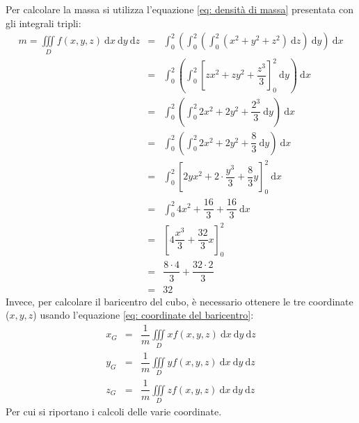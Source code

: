 \documentclass[a4paper]{article}
\begin{document}
	\noindent
	Per calcolare la massa si utilizza l'equazione \ref{eq: densità di massa} presentata con gli integrali tripli:
	\begin{equation*}
		\begin{array}{rcl}
			m = \displaystyle\iiint\limits_{D} f\left(x,y,z\right) \:\mathrm{d}x\:\mathrm{d}y\:\mathrm{d}z 
			&=&
			\displaystyle\int_{0}^{2} \left(\int_{0}^{2} \left(\int_{0}^{2} \left(x^{2}+y^{2}+z^{2}\right) \:\mathrm{d}z\right) \: \mathrm{d}y\right) \:\mathrm{d}x \\ [1.5em]
			&=&
			\displaystyle\int_{0}^{2} \left(\int_{0}^{2} \left[ zx^{2}+zy^{2}+ \dfrac{z^{3}}{3} \right]_{0}^{2} \: \mathrm{d}y\right) \:\mathrm{d}x \\ [1.5em]
			&=&
			\displaystyle\int_{0}^{2} \left(\int_{0}^{2} 2x^{2}+ 2y^{2}+ \dfrac{2^{3}}{3} \: \mathrm{d}y\right) \:\mathrm{d}x \\ [1.5em]
			&=&
			\displaystyle\int_{0}^{2} \left(\int_{0}^{2} 2x^{2}+ 2y^{2}+ \dfrac{8}{3} \: \mathrm{d}y\right) \:\mathrm{d}x \\ [1.5em]
			&=&
			\displaystyle\int_{0}^{2} \left[ 2yx^{2}+ 2 \cdot \dfrac{y^{3}}{3}+ \dfrac{8}{3}y \right]_{0}^{2} \:\mathrm{d}x \\ [1.5em]
			&=&
			\displaystyle\int_{0}^{2} 4x^{2}+ \dfrac{16}{3} + \dfrac{16}{3} \:\mathrm{d}x \\ [1.5em]
			&=&
			\left[4\dfrac{x^{3}}{3} + \dfrac{32}{3}x\right]_{0}^{2} \\ [1.5em]
			&=&
			\dfrac{8\cdot 4}{3} + \dfrac{32 \cdot 2}{3} \\ [1em]
			&=&
			32
		\end{array}
	\end{equation*}
	Invece, per calcolare il baricentro del cubo, è necessario ottenere le tre coordinate ($x,y,z$) usando l'equazione \ref{eq: coordinate del baricentro}:
	\begin{equation*}
		\begin{array}{rcl}
			x_{G} &=& \dfrac{1}{m} \displaystyle\iiint\limits_{D} x f\left(x,y,z\right) \:\mathrm{d}x\:\mathrm{d}y\:\mathrm{d}z \\ [2em]
			y_{G} &=& \dfrac{1}{m} \displaystyle\iiint\limits_{D} y f\left(x,y,z\right) \:\mathrm{d}x\:\mathrm{d}y\:\mathrm{d}z \\ [2em]
			z_{G} &=& \dfrac{1}{m} \displaystyle\iiint\limits_{D} z f\left(x,y,z\right) \:\mathrm{d}x\:\mathrm{d}y\:\mathrm{d}z
		\end{array}
	\end{equation*}
	Per cui si riportano i calcoli delle varie coordinate.
	
\end{document}
